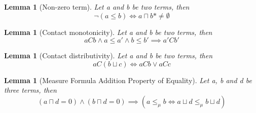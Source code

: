\documentclass{article}
\newtheorem{lemma}[theorem]{Lemma}
\begin{document}
\begin{lemma}[Non-zero term]
	Let a and b be two terms, then
	\begin{equation*}
		\neg(a \le b) \iff a \sqcap b* \neq \emptyset
	\end{equation*}
\end{lemma}

\begin{lemma}[Contact monotonicity]
	Let a and b be two terms, then
	\begin{equation*}
		aCb \land a \leq a' \land b \le b' \implies a'Cb'
	\end{equation*}
\end{lemma}

\begin{lemma}[Contact distributivity]
	Let a and b be two terms, then
	\begin{equation*}
		aC(b \sqcup c) \iff aCb \lor aCc
	\end{equation*}
\end{lemma}

\begin{lemma}[Measure Formula Addition Property of Equality]
	Let a, b and d be three terms, then
	\begin{equation*}
		(a \sqcap d = 0) \land (b \sqcap d = 0) \implies (a \le_\mu b \iff a \sqcup d \le_\mu b \sqcup d)
	\end{equation*}
\end{lemma}
\end{document}
